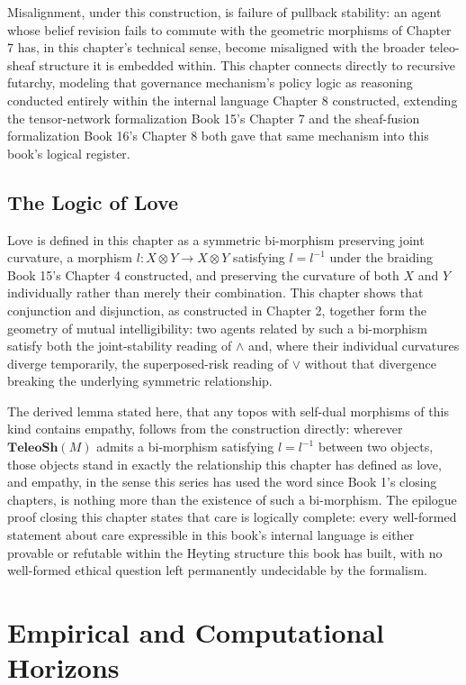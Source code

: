 Misalignment, under this construction, is failure of pullback stability: an agent whose belief revision fails to commute with the geometric morphisms of Chapter 7 has, in this chapter's technical sense, become misaligned with the broader teleo-sheaf structure it is embedded within. This chapter connects directly to recursive futarchy, modeling that governance mechanism's policy logic as reasoning conducted entirely within the internal language Chapter 8 constructed, extending the tensor-network formalization Book 15's Chapter 7 and the sheaf-fusion formalization Book 16's Chapter 8 both gave that same mechanism into this book's logical register.

\chapter{The Logic of Love}

Love is defined in this chapter as a symmetric bi-morphism preserving joint curvature, a morphism $l: X \otimes Y \to X \otimes Y$ satisfying $l = l^{-1}$ under the braiding Book 15's Chapter 4 constructed, and preserving the curvature of both $X$ and $Y$ individually rather than merely their combination. This chapter shows that conjunction and disjunction, as constructed in Chapter 2, together form the geometry of mutual intelligibility: two agents related by such a bi-morphism satisfy both the joint-stability reading of $\wedge$ and, where their individual curvatures diverge temporarily, the superposed-risk reading of $\vee$ without that divergence breaking the underlying symmetric relationship.

The derived lemma stated here, that any topos with self-dual morphisms of this kind contains empathy, follows from the construction directly: wherever $\mathbf{TeleoSh}(M)$ admits a bi-morphism satisfying $l = l^{-1}$ between two objects, those objects stand in exactly the relationship this chapter has defined as love, and empathy, in the sense this series has used the word since Book 1's closing chapters, is nothing more than the existence of such a bi-morphism. The epilogue proof closing this chapter states that care is logically complete: every well-formed statement about care expressible in this book's internal language is either provable or refutable within the Heyting structure this book has built, with no well-formed ethical question left permanently undecidable by the formalism.

\part{Empirical and Computational Horizons}

